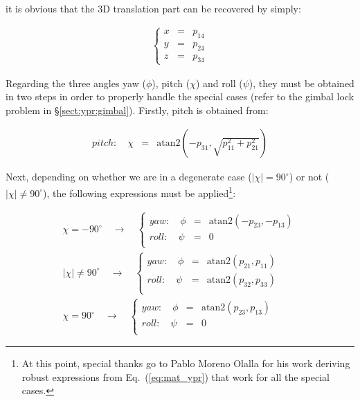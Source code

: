 \documentclass[a4paper,11pt]{report}
\begin{document}
\noindent it is obvious that the 3D translation part can be recovered by simply:

\begin{eqnarray*}
 \left\{
  \begin{array}{rcl}
    x &=& p_{14} \\
    y &=& p_{24} \\
    z &=& p_{34}
  \end{array}
  \right.
\end{eqnarray*}

Regarding the three angles yaw ($\phi$), pitch ($\chi$) and roll ($\psi$), they must be obtained
in two steps in order to properly handle the special cases
(refer to the gimbal lock problem in \S \ref{sect:ypr:gimbal}).
Firstly, pitch is obtained from:

\begin{eqnarray}
pitch: \quad  \chi &=& \mathrm{atan2} \left( -p_{31} , \sqrt{ p_{11}^2 + p_{21}^2 } \right)
\end{eqnarray}

Next, depending on whether we are in a degenerate case ($|\chi|=90^\circ$) or
not ($|\chi| \neq 90^\circ$), the following expressions must
be applied\footnote{At this point, special thanks go to
Pablo Moreno Olalla for his work deriving robust expressions from Eq.~(\ref{eq:mat_ypr})
that work for all the special cases.}:

\begin{eqnarray}
  \chi = -90^\circ \quad \longrightarrow \quad
   \left\{
  \begin{array}{rcl}
    yaw: \quad  \phi  &=& \mathrm{atan2}( -p_{23}, -p_{13} ) \\
    roll: \quad  \psi  &=& 0 \\
  \end{array}
   \right.
\\
  |\chi| \neq 90^\circ \quad \longrightarrow \quad
   \left\{
  \begin{array}{rcl}
    yaw: \quad  \phi   &=& \mathrm{atan2}(p_{21},p_{11}) \\
     roll: \quad  \psi  &=&  \mathrm{atan2}(p_{32},p_{33}) \\
  \end{array}
   \right.
\\
  \chi = 90^\circ \quad \longrightarrow \quad
   \left\{
  \begin{array}{rcl}
    yaw: \quad  \phi  &=& \mathrm{atan2}( p_{23}, p_{13} ) \\
     roll: \quad  \psi  &=& 0 \\
  \end{array}
   \right.
\end{eqnarray}
\end{document}
